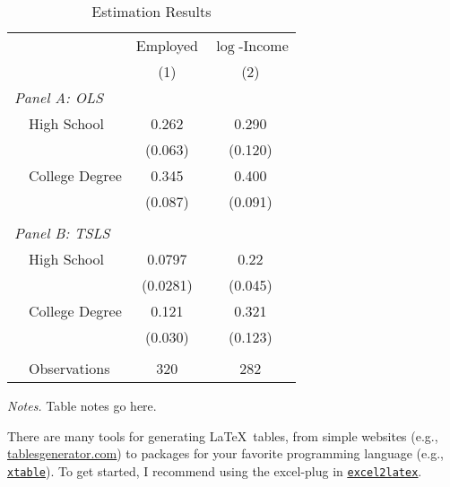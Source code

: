 \begin{table}[!htbp] \small 
  \centering 
  \begin{threeparttable}
  \caption{Estimation Results}\label{pset1:tab_estres}
\begin{tabular}{llcc} \toprule \midrule 
      &       & Employed & $\log$-Income  \\ 
      &       & (1) & (2) \\ \midrule
\multicolumn{3}{l}{\textit{Panel A:  OLS}} \\
      & High School & 0.262 & 0.290 \\
      &       & (0.063) & (0.120) \\
      & College Degree & 0.345 & 0.400\\
      &       & (0.087) & (0.091) \\
      &       &          & \\
\multicolumn{3}{l}{\textit{Panel B:  TSLS}} \\
      & High School & 0.0797 & 0.22 \\
      &       & (0.0281) & (0.045) \\
      & College Degree & 0.121 & 0.321\\
      &       & (0.030) & (0.123) \\
      &       &          & \\
      &  Observations & 320 & 282 \\ \midrule \bottomrule
\end{tabular}%
  \begin{tablenotes}
  \footnotesize \item \textit{Notes.} Table notes go here.
  \end{tablenotes}
    \end{threeparttable}
\end{table}

There are many tools for generating \LaTeX \ tables, from simple websites (e.g., \href{https://www.tablesgenerator.com/}{\underline{tablesgenerator.com}}) to packages for your favorite programming language (e.g., \href{https://cran.r-project.org/web/packages/xtable/index.html}{\underline{\texttt{xtable}}}). To get started, I recommend using the excel-plug in \href{https://ctan.org/thttps://cran.r-project.org/web/packages/xtable/index.htmlex-archive/support/excel2latex?lang=en}{\underline{\texttt{excel2latex}}}. 

\newpage
\section{}

